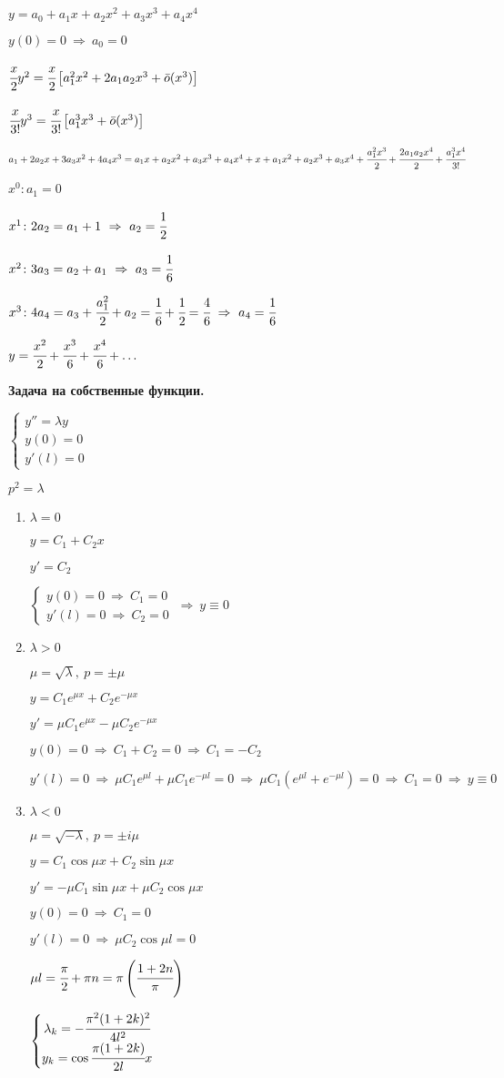 \documentclass[draft]{report}
\newcommand{\sys}[1]{\left\{\begin{matrix}#1\end{matrix}\right.}
\renewcommand{\l}{\lambda}
\newcommand{\then}{\ \Rightarrow\ }
\begin{document}
$y=a_0+a_1x+a_2x^2+a_3x^3+a_4x^4$

$y(0)=0\then a_0=0$

$\cfrac x2y^2=\cfrac x2\left[a_1^2x^2+2a_1a_2x^3+\bar{o}(x^3)\right]$

$\cfrac x{3!}y^3=\cfrac x{3!}\left[a_1^3x^3+\bar{o}(x^3)\right]$

$a_1+2a_2x+3a_3x^2+4a_4x^3=a_1x+a_2x^2+a_3x^3+a_4x^4+x+a_1x^2+a_2x^3+a_3x^4+\cfrac{a_1^2x^3}{2}+\cfrac{2a_1a_2x^4}{2}+\cfrac{a_1^3x^4}{3!}$

$x^0\colon a_1=0$

$x^1\colon 2a_2=a_1+1\then a_2=\cfrac12$

$x^2\colon 3a_3=a_2+a_1\then a_3=\cfrac16$

$x^3\colon 4a_4=a_3+\cfrac{a_1^2}2+a_2=\cfrac16+\cfrac12=\cfrac46\then a_4=\cfrac16$

$y=\cfrac{x^2}2+\cfrac{x^3}6+\cfrac{x^4}6+\ldots$

{\bfseries Задача на собственные функции.}

$\sys{y''=\l y \\ y(0)=0 \\ y'(l)=0}$

$p^2=\l$
\begin{enumerate}
\item $\l=0$

$y=C_1+C_2x$

$y'=C_2$

$\sys{y(0)=0\ \Rightarrow\ C_1=0\\y'(l)=0\ \Rightarrow\ C_2=0}\ \Rightarrow\ y\equiv0$
\item $\l>0$

$\mu=\sqrt{\l},\ p=\pm\mu$

$y=C_1e^{\mu x}+C_2e^{-\mu x}$

$y'=\mu C_1e^{\mu x}-\mu C_2e^{-\mu x}$

$y(0)=0\then C_1+C_2=0\then C_1=-C_2$

$y'(l)=0\then \mu C_1e^{\mu l}+\mu C_1e^{-\mu l}=0\then \mu C_1(e^{\mu l}+e^{-\mu l})=0 \then C_1=0\then y\equiv 0$
\item $\l<0$

$\mu=\sqrt{-\l},\ p=\pm i\mu$

$y=C_1\cos\mu x+C_2\sin\mu x$

$y'=-\mu C_1\sin\mu x+\mu C_2\cos\mu x$

$y(0)=0\then C_1=0$

$y'(l)=0\then \mu C_2\cos\mu l=0$

$\mu l=\cfrac\pi2+\pi n=\pi\left(\cfrac{1+2n}\pi\right)$

$\sys{\l_k=-\cfrac{\pi^2(1+2k)^2}{4l^2} \\ y_k=\cos\cfrac{\pi(1+2k)}{2l}x}$
\end{enumerate}
\end{document}
